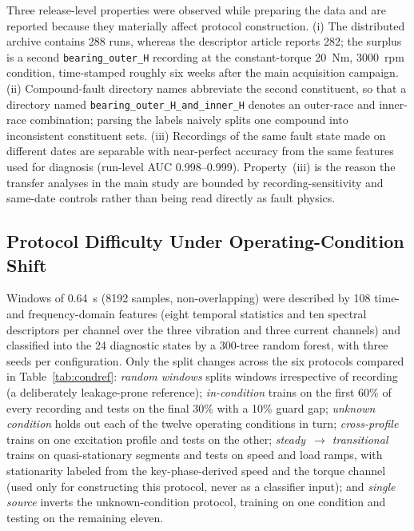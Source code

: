 \documentclass[journal]{IEEEtran}
\begin{document}
Three release-level properties were observed while preparing the data and are
reported because they materially affect protocol construction. (i) The
distributed archive contains 288 runs, whereas the descriptor article
reports 282; the surplus is a second \texttt{bearing\_outer\_H} recording at
the constant-torque 20~Nm, 3000~rpm condition, time-stamped roughly six weeks
after the main acquisition campaign. (ii) Compound-fault directory names
abbreviate the second constituent, so that a directory named
\texttt{bearing\_outer\_H\_and\_inner\_H} denotes an outer-race and
inner-race combination; parsing the labels naively splits one compound into
inconsistent constituent sets. (iii) Recordings of the same fault state made
on different dates are separable with near-perfect accuracy from the same
features used for diagnosis (run-level AUC 0.998--0.999). Property~(iii) is
the reason the transfer analyses in the main study are bounded by
recording-sensitivity and same-date controls rather than being read directly
as fault physics.

\subsection{Protocol Difficulty Under Operating-Condition Shift}
\label{app:protocols}

Windows of 0.64~s (8192 samples, non-overlapping) were described by 108 time-
and frequency-domain features (eight temporal statistics and ten spectral
descriptors per channel over the three vibration and three current channels)
and classified into the 24 diagnostic states by a 300-tree random forest, with
three seeds per configuration. Only the split changes across the six
protocols compared in Table~\ref{tab:condref}: \emph{random windows} splits
windows irrespective of recording (a deliberately leakage-prone reference);
\emph{in-condition} trains on the first 60\% of every recording and tests on
the final 30\% with a 10\% guard gap; \emph{unknown condition} holds out each
of the twelve operating conditions in turn; \emph{cross-profile} trains on one
excitation profile and tests on the other; \emph{steady~$\rightarrow$
transitional} trains on quasi-stationary segments and tests on speed and load
ramps, with stationarity labeled from the key-phase-derived speed and the
torque channel (used only for constructing this protocol, never as a
classifier input); and \emph{single source} inverts the unknown-condition
protocol, training on one condition and testing on the remaining eleven.
\end{document}
